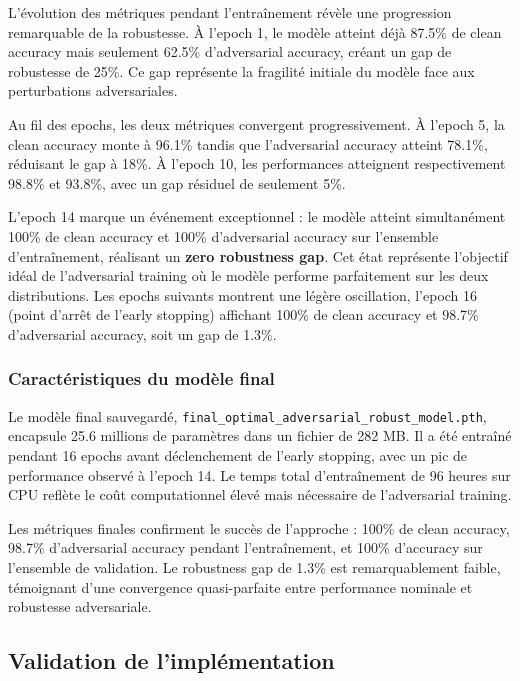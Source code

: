 L'évolution des métriques pendant l'entraînement révèle une progression remarquable de la robustesse. À l'epoch 1, le modèle atteint déjà 87.5\% de clean accuracy mais seulement 62.5\% d'adversarial accuracy, créant un gap de robustesse de 25\%. Ce gap représente la fragilité initiale du modèle face aux perturbations adversariales.

Au fil des epochs, les deux métriques convergent progressivement. À l'epoch 5, la clean accuracy monte à 96.1\% tandis que l'adversarial accuracy atteint 78.1\%, réduisant le gap à 18\%. À l'epoch 10, les performances atteignent respectivement 98.8\% et 93.8\%, avec un gap résiduel de seulement 5\%.

L'epoch 14 marque un événement exceptionnel : le modèle atteint simultanément 100\% de clean accuracy et 100\% d'adversarial accuracy sur l'ensemble d'entraînement, réalisant un \textbf{zero robustness gap}. Cet état représente l'objectif idéal de l'adversarial training où le modèle performe parfaitement sur les deux distributions. Les epochs suivants montrent une légère oscillation, l'epoch 16 (point d'arrêt de l'early stopping) affichant 100\% de clean accuracy et 98.7\% d'adversarial accuracy, soit un gap de 1.3\%.

\subsubsection{Caractéristiques du modèle final}

Le modèle final sauvegardé, \texttt{final\_optimal\_adversarial\_robust\_model.pth}, encapsule 25.6 millions de paramètres dans un fichier de 282 MB. Il a été entraîné pendant 16 epochs avant déclenchement de l'early stopping, avec un pic de performance observé à l'epoch 14. Le temps total d'entraînement de 96 heures sur CPU reflète le coût computationnel élevé mais nécessaire de l'adversarial training.

Les métriques finales confirment le succès de l'approche : 100\% de clean accuracy, 98.7\% d'adversarial accuracy pendant l'entraînement, et 100\% d'accuracy sur l'ensemble de validation. Le robustness gap de 1.3\% est remarquablement faible, témoignant d'une convergence quasi-parfaite entre performance nominale et robustesse adversariale.

\subsection{Validation de l'implémentation}

